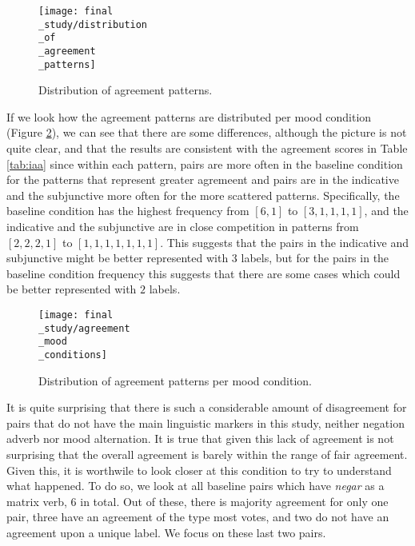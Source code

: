 \begin{figure}
\parbox{15cm}{\texttt{[image: final\\\_study/distribution\\\_of\\\_agreement\\\_patterns]}
\caption{Distribution of agreement patterns.}\label{fig:pat}}
\qquad
\end{figure}

If we look how the agreement patterns are distributed per mood condition (Figure \ref{fig:moodpat}), we can see that there are some differences, although the picture is not quite clear, and that the results are consistent with the agreement scores in Table \ref{tab:iaa} since within each pattern, pairs are more often in the baseline condition for the patterns that represent greater agremeent and pairs are in the indicative and the subjunctive more often for the more scattered patterns. Specifically, the baseline condition has the highest frequency from $[6,1]$ to $[3,1,1,1,1]$, and the indicative and the subjunctive are in close competition in patterns from $[2,2,2,1]$ to $[1,1,1,1,1,1,1]$. This suggests that the pairs in the indicative and subjunctive might be better represented with 3 labels, but for the pairs in the baseline condition frequency this suggests that there are some cases which could be better represented with $2$ labels.\\

\begin{figure}
\parbox{15cm}{\texttt{[image: final\\\_study/agreement\\\_mood\\\_conditions]}
\caption{Distribution of agreement patterns per mood condition.}\label{fig:moodpat}}
\qquad
\end{figure}

It is quite surprising that there is such a considerable amount of disagreement for pairs that do not have the main linguistic markers in this study, neither negation adverb nor mood alternation. It is true that given this lack of agreement is not surprising that the overall agreement is barely within the range of fair agreement. Given this, it is worthwile to look closer at this condition to try to understand what happened. To do so, we look at all baseline pairs which have \textit{negar} as a matrix verb, $6$ in total. Out of these, there is majority agreement for only one pair, three have an agreement of the type most votes, and two do not have an agreement upon a unique label. We focus on these last two pairs.\\

